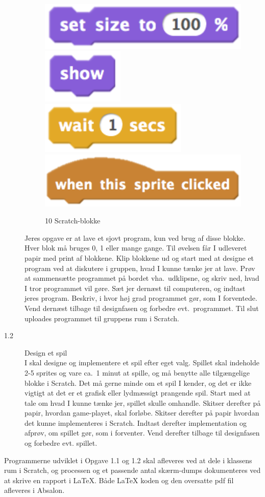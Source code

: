 \documentclass[a4paper,12pt]{article}
\begin{document}
\begin{description}
\begin{figure}
    \includegraphics[height=0.04\paperheight]{setSize.png}
    \includegraphics[height=0.04\paperheight]{show.png}
    \includegraphics[height=0.04\paperheight]{wait.png}
    \includegraphics[height=0.055\paperheight]{when.png}
    \caption{10 Scratch-blokke}
    \label{fig:blokke}
  \end{figure}
  Jeres opgave er at lave et sjovt program, kun ved brug af disse blokke. Hver blok må bruges 0, 1 eller mange gange. Til øvelsen får I udleveret papir med print af blokkene. Klip blokkene ud og start med at designe et program ved at diskutere i gruppen, hvad I kunne tænke jer at lave. Prøv at sammensætte programmet på bordet vha.\ udklipsne, og skriv ned, hvad I tror programmet vil gøre. Sæt jer dernæst til computeren, og indtast jeres program. Beskriv, i hvor høj grad programmet gør, som I forventede. Vend dernæst tilbage til designfasen og forbedre evt.\ programmet. Til slut uploades programmet til gruppens rum i Scratch.
\item[1.2] Design et spil\\
  I skal designe og implementere et spil efter eget valg. Spillet skal indeholde 2-5 sprites og vare ca.\ 1 minut at spille, og må benytte alle tilgængelige blokke i Scratch. Det må gerne minde om et spil I kender, og det er ikke vigtigt at det er et grafisk eller lydmæssigt prangende spil. Start med at tale om hvad I kunne tænke jer, spillet skulle omhandle. Skitser derefter på papir, hvordan game-playet, skal forløbe. Skitser derefter på papir hvordan det kunne implementeres i Scratch. Indtast derefter implementation og afprøv, om spillet gør, som i forventer. Vend derefter tilbage til designfasen og forbedre evt. spillet.
\end{description}
Programmerne udviklet i Opgave 1.1 og 1.2 skal afleveres ved at dele i klassens rum i Scratch, og processen og et passende antal skærm-dumps dokumenteres ved at skrive en rapport i LaTeX. Både LaTeX koden og den oversatte pdf fil afleveres i Absalon.
\end{document}
